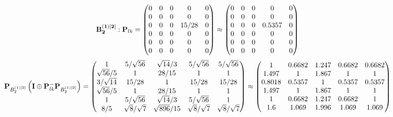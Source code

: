 \documentclass[10pt,a4paper]{article}
\begin{document}
	\[
		\bold{B_2^{(1)[2]}}: \bold{P}_{lk} = 
		\begin{pmatrix}
			{{0}}{} & {{0}}{} & {{0}}{} & {{0}}{} & {{0}}{} \\
			{{0}}{} & {{0}}{} & {{0}}{} & {{0}}{} & {{0}}{} \\
			{{0}}{} & {{0}}{} & {{0}}{} & {{15}} / {{28}} & {{0}}{} \\
			{{0}}{} & {{0}}{} & {{0}}{} & {{0}}{} & {{0}}{} \\
			{{0}}{} & {{0}}{} & {{0}}{} & {{0}}{} & {{0}}{} \\
			{{0}}{} & {{0}}{} & {{0}}{} & {{0}}{} & {{0}}{} \\
		\end{pmatrix}
		\approx
		\begin{pmatrix}
			0        & 0        & 0        & 0        & 0        \\
			0        & 0        & 0        & 0        & 0        \\
			0        & 0        & 0        & 0.5357   & 0        \\
			0        & 0        & 0        & 0        & 0        \\
			0        & 0        & 0        & 0        & 0        \\
			0        & 0        & 0        & 0        & 0        \\
		\end{pmatrix}
	\]
	\[
		\bold{P}_{B_2^{(1)[2]}}\left(\bold{I} \oplus \bold{P}_{lk}^{-}\bold{P}_{B_2^{(1)[2]}}\right) = 
		\begin{pmatrix}
			{1}{} & {{5}} / {\sqrt{56}} & {\sqrt{14}} / {{3}} & {{5}} / {\sqrt{56}} & {{5}} / {\sqrt{56}} \\
			{\sqrt{56}} / {{5}} & {1}{} & {{28}} / {{15}} & {1}{} & {1}{} \\
			{{3}} / {\sqrt{14}} & {{15}} / {{28}} & {1}{} & {{15}} / {{28}} & {{15}} / {{28}} \\
			{\sqrt{56}} / {{5}} & {1}{} & {{28}} / {{15}} & {1}{} & {1}{} \\
			{1}{} & {{5}} / {\sqrt{56}} & {\sqrt{14}} / {{3}} & {{5}} / {\sqrt{56}} & {1}{} \\
			{{8}} / {{5}} & {\sqrt{8}} / {\sqrt{7}} & {\sqrt{896}} / {{15}} & {\sqrt{8}} / {\sqrt{7}} & {\sqrt{8}} / {\sqrt{7}} \\
		\end{pmatrix}
		\approx
		\begin{pmatrix}
			1        & 0.6682   & 1.247    & 0.6682   & 0.6682   \\
			1.497    & 1        & 1.867    & 1        & 1        \\
			0.8018   & 0.5357   & 1        & 0.5357   & 0.5357   \\
			1.497    & 1        & 1.867    & 1        & 1        \\
			1        & 0.6682   & 1.247    & 0.6682   & 1        \\
			1.6      & 1.069    & 1.996    & 1.069    & 1.069    \\
		\end{pmatrix}
	\]
\end{document}
